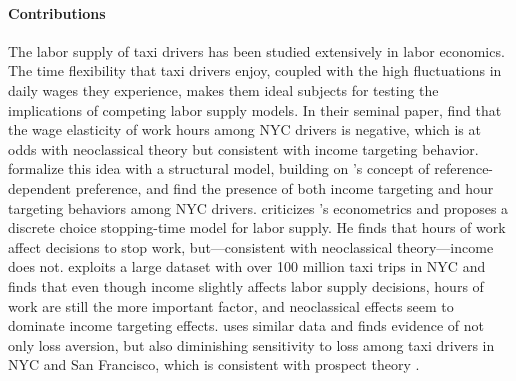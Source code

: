 \documentclass[reviewmode]{restat}
\begin{document}
\paragraph{Contributions} 

The labor supply of taxi drivers has been studied extensively in labor economics. 
The time flexibility that taxi drivers enjoy, coupled with the high fluctuations in daily wages they
experience, makes them ideal subjects for testing the implications of competing labor supply models. 
In their seminal paper, \citet{camerer1997labor} find that the wage elasticity of work hours among NYC 
drivers is negative, which is at odds with neoclassical theory but consistent with income targeting behavior.
\citet{crawford2011new} formalize this idea with a structural model, 
building on \citeauthor{kHoszegi2006model}'s \citeyear{kHoszegi2006model} concept of 
reference-dependent preference, and find the presence of both income targeting and hour targeting
behaviors among NYC drivers. \citet{farber2005tomorrow} criticizes \citeauthor{camerer1997labor}'s
econometrics and proposes a discrete choice stopping-time model for labor supply. 
He finds that hours of work affect decisions to stop work, but---consistent with neoclassical theory---income does not.
\citet{farber2015you} exploits a large dataset with over 100 million taxi trips in NYC and finds that
even though income slightly affects labor supply decisions, hours of work are still the more important factor, 
and neoclassical effects seem to dominate income targeting effects. 
\citet{martin2017quit} uses similar data and finds evidence of not only loss aversion,
but also diminishing sensitivity to loss among taxi drivers in NYC and San Francisco, which is consistent with prospect theory \citep{kahneman1979prospect}. 
\end{document}
